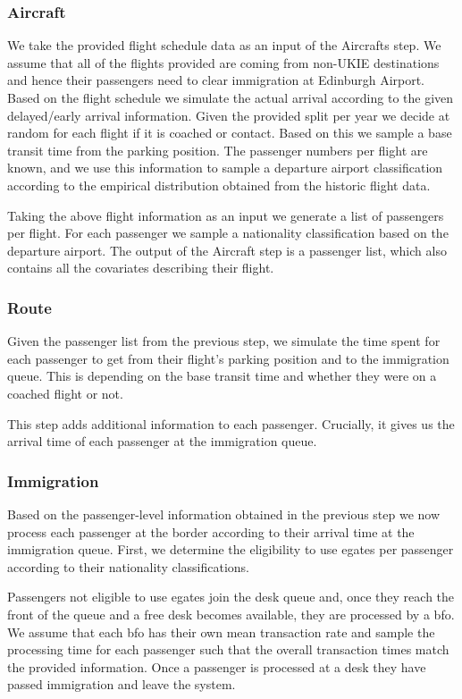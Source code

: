 \documentclass[10pt]{article}
\begin{document}
\subsubsection{Aircraft}
We take the provided flight schedule data as an input of the Aircrafts step. We assume that all of the flights provided are coming from non-UKIE destinations and hence their passengers need to clear immigration at Edinburgh Airport. Based on the flight schedule we simulate the actual arrival according to the given delayed/early arrival information. Given the provided split per year we decide at random for each flight if it is coached or contact. Based on this we sample a base transit time from the parking position. The passenger numbers per flight are known, and we use this information to sample a departure airport classification according to the empirical distribution obtained from the historic flight data.

Taking the above flight information as an input we generate a list of passengers per flight. For each passenger we sample a nationality classification based on the departure airport. The output of the Aircraft step is a passenger list, which also contains all the covariates describing their flight.

\subsubsection{Route}

Given the passenger list from the previous step, we simulate the time spent for each passenger to get from their flight's parking position and to the immigration queue. This is depending on the base transit time and whether they were on a coached flight or not.

This step adds additional information to each passenger. Crucially, it gives us the arrival time of each passenger at the immigration queue. 

\subsubsection{Immigration}

Based on the passenger-level information obtained in the previous step we now process each passenger at the border according to their arrival time at the immigration queue. First, we determine the eligibility to use \glspl{egate} per passenger according to their nationality classifications. 

Passengers not eligible to use \glspl{egate} join the desk queue and, once they reach the front of the queue and a free desk becomes available, they are processed by a \gls{bfo}. We assume that each \gls{bfo} has their own mean transaction rate and sample the processing time for each passenger such that the overall transaction times match the provided information. Once a passenger is processed at a desk they have passed immigration and leave the system.
\end{document}
